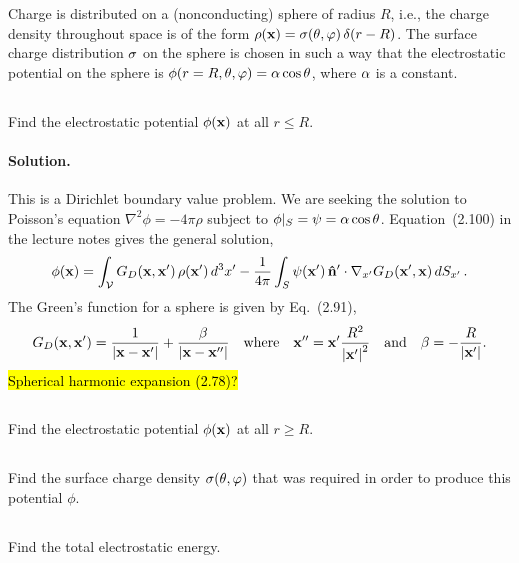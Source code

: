 \documentclass[11pt]{article}
\renewcommand{\vec}[1]{\mathbf{#1}}
\newcommand{\beq}{\begin{equation*}}
\newcommand{\eeq}{\end{equation*}}
\newenvironment{statement}[1]
{
	\section{#1}
	\color{darkgray}
	\ignorespaces
}
{
}
\newenvironment{problem}
{
	\subsection{}
	\color{darkgray}
    \ignorespaces
}
{

}
\newenvironment{solution}
{
    \paragraph{Solution.}
    \ignorespaces
}
{
    \bigskip
}
\begin{document}
\newcommand{\lap}{\nabla^2}
\newcommand{\Gd}{G_D}
\newcommand{\Gdxxp}{\Gd(\vx, \vx')}
\newcommand{\Gdxpx}{\Gd(\vx', \vx)}
\newcommand{\psixp}{\psi(\vx')}
\newcommand{\nh}{\vec{\hat{n}}}
\newcommand{\nabxp}{\nabla_{x'}}
\newcommand{\dSxp}{\dd{S_{x'}}}
\newcommand{\absxp}{\abs{\vx'}}

\begin{statement}{}
	Charge is distributed on a (nonconducting) sphere of radius $R$, i.e., the charge density throughout space is of the form $\rhox = \sig(\tht, \vph) \, \delta(r - R)$.  The surface charge distribution $\sigma$ on the sphere is chosen in such a way that the electrostatic potential on the sphere is $\phi(r=R, \theta, \varphi) = \alpha \cos\theta$, where $\alpha$ is a constant.
\end{statement}

\begin{problem}
	Find the electrostatic potential $\phix$ at all $r \leq R$.
\end{problem}

\begin{solution}
	This is a Dirichlet boundary value problem.  We are seeking the solution to Poisson's equation $\lap\phi = -4\pi\rho$ subject to $\phi|_S = \psi = \alpha \cos\theta$.  Equation~(2.100) in the lecture notes gives the general solution,
	\beq
		\phix = \intV \Gdxxp \, \rhoxp \dcxp - \frac{1}{4\pi} \intS \psixp \, \nh' \cdot \nabxp \Gdxpx \dSxp.
	\eeq
	The Green's function for a sphere is given by Eq.~(2.91),
	\beq
		\Gdxxp = \frac{1}{\abs{\vx - \vx'}} + \frac{\beta}{\abs{\vx - \vx''}} \qq{where} \vx'' = \vx' \frac{R^2}{\absxp^2} \qand \beta = - \frac{R}{\absxp}.
	\eeq
	\hl{Spherical harmonic expansion (2.78)?}
\end{solution}


\begin{problem}
	Find the electrostatic potential $\phix$ at all $r \geq R$.
\end{problem}

\begin{problem}
	Find the surface charge density $\sigma(\theta, \varphi)$ that was required in order to produce this potential $\phi$.
\end{problem}

\begin{problem}
	Find the total electrostatic energy.
\end{problem}



\newcommand{\vF}{\vec{F}}
\newcommand{\vE}{\vec{E}}
\newcommand{\rh}{\vec{\hat{r}}}
\newcommand{\thh}{\boldsymbol{\hat{\tht}}}
\newcommand{\phh}{\boldsymbol{\hat{\vph}}}
\newcommand{\nabx}{\nabla_{\!x}}
\newcommand{\Er}{E_r}
\end{document}
